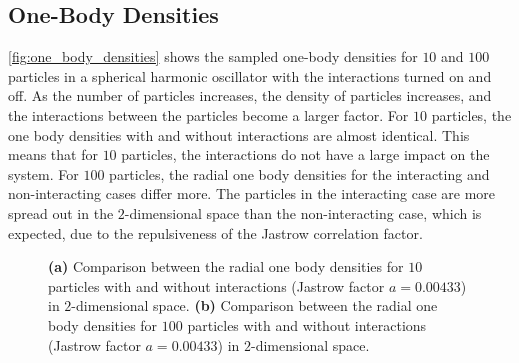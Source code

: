 \FloatBarrier

\subsection{One-Body Densities}

\autoref{fig:one_body_densities} shows the sampled one-body densities for $10$ and $100$ particles in a spherical harmonic oscillator with the interactions turned on and off. As the number of particles increases, the density of particles increases, and the interactions between the particles become a larger factor. For $10$ particles, the one body densities with and without interactions are almost identical. This means that for $10$ particles, the interactions do not have a large impact on the system. For $100$ particles, the radial one body densities for the interacting and non-interacting cases differ more. The particles in the interacting case are more spread out in the $2$-dimensional space than the non-interacting case, which is expected, due to the repulsiveness of the Jastrow correlation factor. 
\begin{figure}[H]
\centering
{} 
\qquad
{}
\caption{\textbf{(a)} Comparison between the radial one body densities for $10$ particles with and without interactions (Jastrow factor $a=0.00433$) in $2$-dimensional space. \textbf{(b)} Comparison between the radial one body densities for $100$ particles with and without interactions (Jastrow factor $a=0.00433$) in $2$-dimensional space.}
\label{fig:one_body_densities}
\end{figure}



